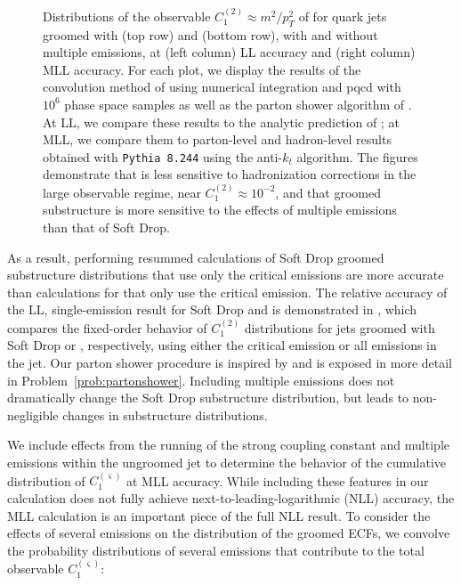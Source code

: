 \begin{figure}[t!]
{\label{fig:MLL_PRSF1}
}
\caption[Distributions of the observable \(C_1^{(2)}\approx m^2 / p_T^2\) for quark jets groomed with  and .]{
Distributions of the observable \(C_1^{(2)}\approx m^2 / p_T^2\) of  for quark jets groomed with  (top row) and  (bottom row), with and without multiple emissions, at (left column) LL accuracy and (right column) MLL accuracy.
%
For each plot, we display the results of the convolution method of  using numerical integration and \gls{pqcd} with \(10^6\) phase space samples as well as the parton shower algorithm of .
%
At LL, we compare these results to the analytic prediction of ;
%
at MLL, we compare them to parton-level and hadron-level results obtained with \texttt{Pythia 8.244} using the anti-\(k_t\) algorithm.
%
The figures demonstrate that  is less sensitive to \gls{hadronization} corrections in the large observable regime, near \(C_1^{(2)} \approx 10^{-2}\), and that  groomed substructure is more sensitive to the effects of multiple emissions than that of Soft Drop.
}
\label{fig:Calculations}
\end{figure}

As a result, performing resummed calculations of Soft Drop groomed substructure distributions that use only the critical emissions are more accurate than calculations for  that only use the critical emission.
%
The relative accuracy of the LL, single-emission result for Soft Drop and  is demonstrated in , which compares the fixed-order behavior of \(C_1^{(2)}\) distributions for jets groomed with Soft Drop or , respectively, using either the critical emission or all emissions in the jet.
%
Our parton shower procedure is inspired by  and is exposed in more detail in Problem~\ref{prob:partonshower}.
%
Including multiple emissions does not dramatically change the Soft Drop substructure distribution, but leads to non-negligible changes in  substructure distributions.


%
We include effects from the running of the strong coupling constant and multiple emissions within the ungroomed jet to determine the behavior of the cumulative distribution of \(C_1^{(\varsigma)}\) at MLL accuracy.
%
While including these features in our calculation does not fully achieve next-to-leading-logarithmic (NLL) accuracy, the MLL calculation is an important piece of the full NLL result.
%
To consider the effects of several emissions on the distribution of the groomed ECFs, we convolve the probability distributions of several emissions that contribute to the total observable \(C_1^{(\varsigma)}\):

